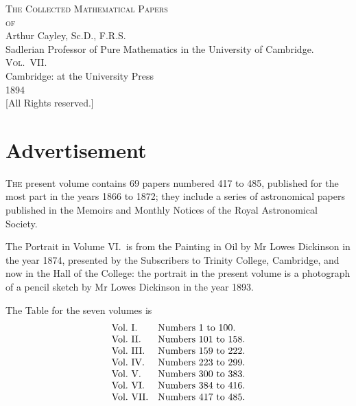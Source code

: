 \documentclass[11pt,a4paper]{article}
\begin{document}
\thispagestyle{empty}
\begin{center}
\vspace*{2cm}
{\Huge\scshape The Collected Mathematical Papers}\\[1.5em]
{\LARGE\scshape of}\\[1.5em]
{\Huge Arthur Cayley, Sc.D., F.R.S.}\\[1em]
{\normalsize Sadlerian Professor of Pure Mathematics in the University of Cambridge.}\\[2em]
{\LARGE\scshape Vol.\ VII.}\\[3em]
{\large Cambridge: at the University Press}\\[1em]
{1894}\\[1em]
{\footnotesize [All Rights reserved.]}
\end{center}
\vfill
\clearpage

\thispagestyle{empty}
\section*{Advertisement}

\textsc{The} present volume contains 69 papers numbered 417 to 485, published for
the most part in the years 1866 to 1872; they include a series of astronomical
papers published in the Memoirs and Monthly Notices of the Royal Astronomical
Society.

The Portrait in Volume VI.\ is from the Painting in Oil by Mr Lowes Dickinson
in the year 1874, presented by the Subscribers to Trinity College, Cambridge,
and now in the Hall of the College: the portrait in the present volume is a
photograph of a pencil sketch by Mr Lowes Dickinson in the year 1893.

\medskip

The Table for the seven volumes is
\[
\begin{array}{l@{\quad}l}
\text{Vol.\ I.}   & \text{Numbers } 1   \text{ to } 100. \\
\text{Vol.\ II.}  & \text{Numbers } 101 \text{ to } 158. \\
\text{Vol.\ III.} & \text{Numbers } 159 \text{ to } 222. \\
\text{Vol.\ IV.}  & \text{Numbers } 223 \text{ to } 299. \\
\text{Vol.\ V.}   & \text{Numbers } 300 \text{ to } 383. \\
\text{Vol.\ VI.}  & \text{Numbers } 384 \text{ to } 416. \\
\text{Vol.\ VII.} & \text{Numbers } 417 \text{ to } 485. \\
\end{array}
\]
\end{document}
